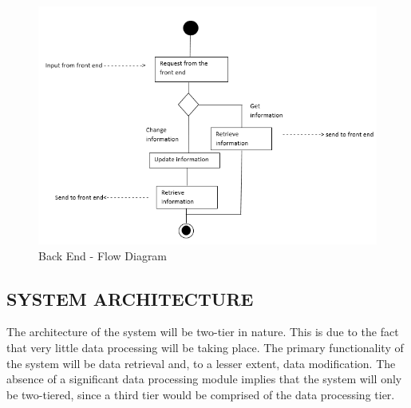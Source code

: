 \documentclass[journal,comsoc,onecolumn]{IEEEtran}
\begin{document}
\begin{figure}[hbt!]
\centering
\includegraphics[width=0.7\linewidth]{"Back End - Flow Diagram"}
\caption{Back End - Flow Diagram}
\label{fig:BackEnd-FlowDiagram}
\end{figure}



\subsection{SYSTEM ARCHITECTURE}

The architecture of the system will be two-tier in nature. This is due to the fact that very little data processing will be taking place. The primary functionality of the system will be data retrieval and, to a lesser extent, data modification. The absence of a significant data processing module implies that the system will only be two-tiered, since a third tier would be comprised of the data processing tier.

\end{document}
